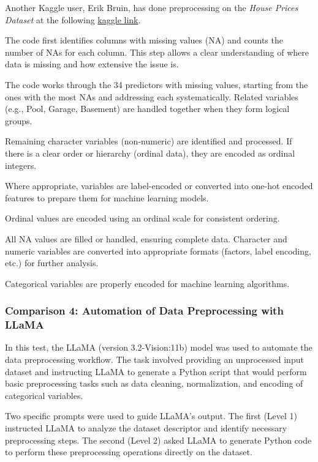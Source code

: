 Another Kaggle user, Erik Bruin, has done preprocessing on the \textit{House
    Prices Dataset} at the following
\href{https://www.kaggle.com/code/erikbruin/house-prices-lasso-xgboost-and-a-detailed-eda}{kaggle
    link}.

The code first identifies columns with missing values (NA) and counts the
number of NAs for each column. This step allows a clear understanding of where
data is missing and how extensive the issue is.

The code works through the 34 predictors with missing values, starting from the
ones with the most NAs and addressing each systematically. Related variables
(e.g., Pool, Garage, Basement) are handled together when they form logical
groups.

Remaining character variables (non-numeric) are identified and processed. If
there is a clear order or hierarchy (ordinal data), they are encoded as ordinal
integers.

Where appropriate, variables are label-encoded or converted into one-hot
encoded features to prepare them for machine learning models.

Ordinal values are encoded using an ordinal scale for consistent ordering.

All NA values are filled or handled, ensuring complete data. Character and
numeric variables are converted into appropriate formats (factors, label
encoding, etc.) for further analysis.

Categorical variables are properly encoded for machine learning algorithms.

\subsubsection{Comparison 4: Automation of Data Preprocessing with LLaMA}

In this test, the LLaMA (version 3.2-Vision:11b) model was used to automate the
data preprocessing workflow. The task involved providing an unprocessed input
dataset and instructing LLaMA to generate a Python script that would perform
basic preprocessing tasks such as data cleaning, normalization, and encoding of
categorical variables.

Two specific prompts were used to guide LLaMA's output. The first (Level 1)
instructed LLaMA to analyze the dataset descriptor and identify necessary
preprocessing steps. The second (Level 2) asked LLaMA to generate Python code
to perform these preprocessing operations directly on the dataset.

